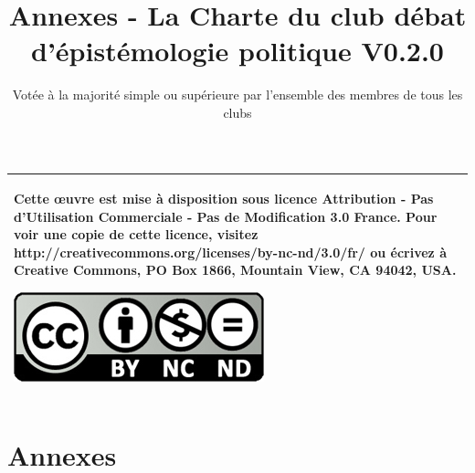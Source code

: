 \documentclass[a4paper,12pt]{article}
\title{\Huge{Annexes - La Charte du club débat d'épistémologie politique} \LARGE{V0.2.0}}
\author{Votée à la majorité simple ou supérieure par l'ensemble des membres de tous les clubs}
\begin{document}
\maketitle

\begin{tabular}{|p{}|}
 \hline
 Cette œuvre est mise à disposition sous licence Attribution - Pas d’Utilisation Commerciale - Pas de Modification 3.0 France. Pour voir une copie de cette licence, visitez http://creativecommons.org/licenses/by-nc-nd/3.0/fr/ ou écrivez à Creative Commons, PO Box 1866, Mountain View, CA 94042, USA.
 \begin{center}
 \includegraphics[scale=1]{cc.jpg}
 \end{center}\\
 \hline
\end{tabular}
\newpage
\tableofcontents
\newpage

\part{Annexes}
\end{document}
